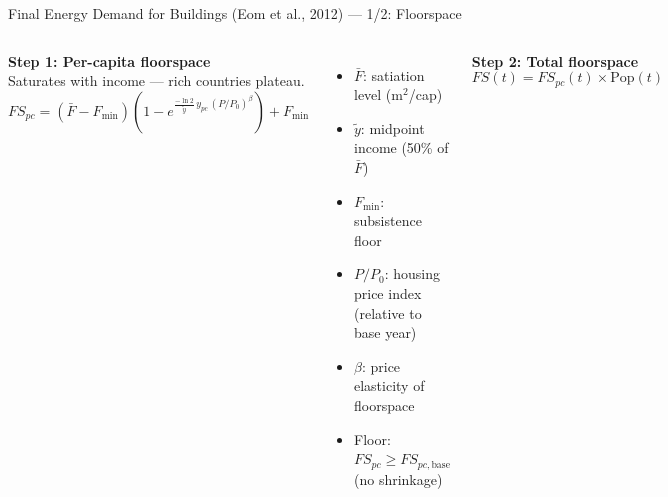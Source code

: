 \documentclass[aspectratio=169, 10pt]{beamer}
\begin{document}
\begin{frame}[t]{Final Energy Demand for Buildings (Eom et al., 2012) --- 1/2: Floorspace}
\begin{columns}[T]
\small
\vspace{0.2em}

\textbf{Step 1: Per-capita floorspace}\\[2pt]
{\scriptsize Saturates with income --- rich countries plateau.}
\vspace{-0.3em}
$$FS_{pc} = (\bar{F}\!-\!F_{\min})\!\left(1 - e^{\frac{-\ln 2}{\tilde{y}}\, y_{pc}\, (P/P_0)^{\beta}}\right) + F_{\min}$$
\vspace{-1.0em}
\begin{itemize}\setlength\itemsep{2pt}\setlength\parsep{0pt}
\item[\scriptsize$\bullet$] {\scriptsize $\bar{F}$: satiation level (m$^2$/cap)}
\item[\scriptsize$\bullet$] {\scriptsize $\tilde{y}$: midpoint income (50\% of $\bar{F}$)}
\item[\scriptsize$\bullet$] {\scriptsize $F_{\min}$: subsistence floor}
\item[\scriptsize$\bullet$] {\scriptsize $P/P_0$: housing price index (relative to base year)}
\item[\scriptsize$\bullet$] {\scriptsize $\beta$: price elasticity of floorspace}
\item[\scriptsize$\bullet$] {\scriptsize Floor: $FS_{pc} \geq FS_{pc,\mathrm{base}}$ (no shrinkage)}
\end{itemize}

\vspace{0.4em}
\textbf{Step 2: Total floorspace}
\vspace{-0.3em}
$$FS(t) = FS_{pc}(t) \times \mathrm{Pop}(t)$$


\end{columns}
\end{frame}
\end{document}

